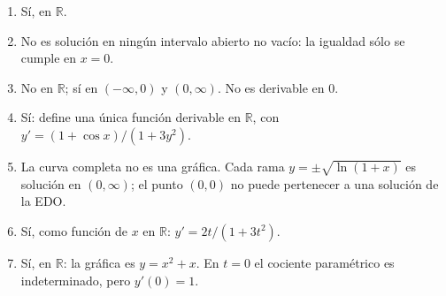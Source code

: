 \begin{enumerate}
\item Sí, en $\mathbb{R}$.
\item No es solución en ningún intervalo abierto no vacío: la igualdad sólo se cumple en $x=0$.
\item No en $\mathbb{R}$; sí en $(-\infty,0)$ y $(0,\infty)$. No es derivable en $0$.
\item Sí: define una única función derivable en $\mathbb{R}$, con $y'=(1+\cos x)/(1+3y^2)$.
\item La curva completa no es una gráfica. Cada rama $y=\pm\sqrt{\ln(1+x)}$ es solución en $(0,\infty)$; el punto $(0,0)$ no puede pertenecer a una solución de la EDO.
\item Sí, como función de $x$ en $\mathbb{R}$: $y'=2t/(1+3t^2)$.
\item Sí, en $\mathbb{R}$: la gráfica es $y=x^2+x$. En $t=0$ el cociente paramétrico es indeterminado, pero $y'(0)=1$.
\end{enumerate}
